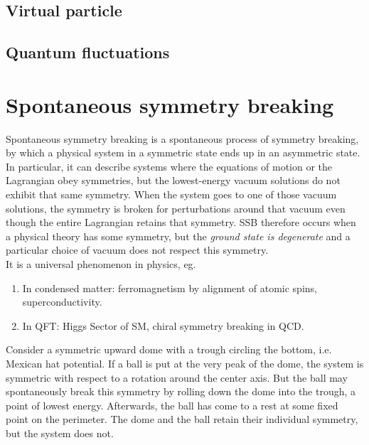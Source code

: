 \subsection{Virtual particle}
\subsection{Quantum fluctuations}

















\section{Spontaneous symmetry breaking}
\label{sec:spontaneoussymmetrybraking}
Spontaneous symmetry breaking is a spontaneous process of symmetry breaking, by which a physical system in a symmetric state ends up in an asymmetric state. In particular, it can describe systems where the equations of motion or the Lagrangian obey symmetries, but the lowest-energy vacuum solutions do not exhibit that same symmetry. When the system goes to one of those vacuum solutions, the symmetry is broken for perturbations around that vacuum even though the entire Lagrangian retains that symmetry. SSB therefore occurs when a physical theory has some symmetry, but the \emph{ground state is degenerate} and a particular choice of vacuum does not respect this symmetry.\\
It is a universal phenomenon in physics, eg. 
\begin{enumerate}
	\item In condensed matter: ferromagnetism by alignment of atomic spins, superconductivity.
	\item In QFT: Higgs Sector of SM, chiral symmetry breaking in QCD.
\end{enumerate}
Consider a symmetric upward dome with a trough circling the bottom, i.e. Mexican hat potential. If a ball is put at the very peak of the dome, the system is symmetric with respect to a rotation around the center axis. But the ball may spontaneously break this symmetry by rolling down the dome into the trough, a point of lowest energy. Afterwards, the ball has come to a rest at some fixed point on the perimeter. The dome and the ball retain their individual symmetry, but the system does not.\\
